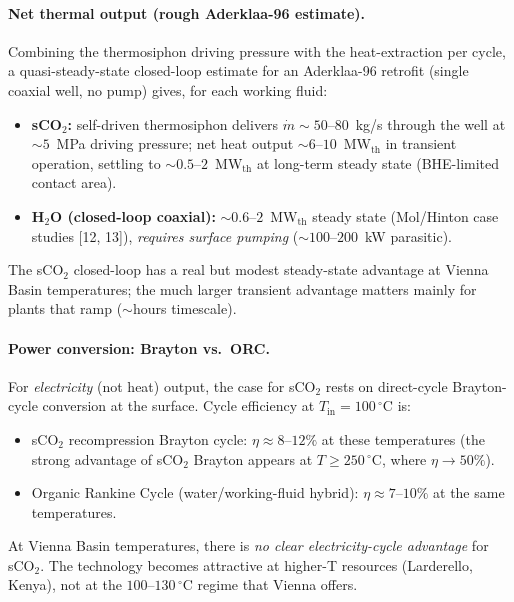 \documentclass{article}
\begin{document}
\paragraph{Net thermal output (rough Aderklaa-96 estimate).}
Combining the thermosiphon driving pressure with the heat-extraction
per cycle, a quasi-steady-state closed-loop estimate for an
Aderklaa-96 retrofit (single coaxial well, no pump) gives, for
each working fluid:
\begin{itemize}
\item \textbf{sCO$_2$:} self-driven thermosiphon delivers
$\dot m \sim 50$--$80$~kg/s through the well at $\sim 5$~MPa
driving pressure; net heat output $\sim 6$--$10$~MW$_{\mathrm{th}}$
in transient operation, settling to $\sim 0.5$--$2$~MW$_{\mathrm{th}}$
at long-term steady state (BHE-limited contact area).
\item \textbf{H$_2$O (closed-loop coaxial):} $\sim 0.6$--$2$~MW$_{\mathrm{th}}$
steady state (Mol/Hinton case studies [12, 13]), \emph{requires
surface pumping} ($\sim 100$--$200$~kW parasitic).
\end{itemize}
The sCO$_2$ closed-loop has a real but modest steady-state
advantage at Vienna Basin temperatures; the much larger
transient advantage matters mainly for plants that ramp
($\sim$hours timescale).

\paragraph{Power conversion: Brayton vs.\ ORC.} For
\emph{electricity} (not heat) output, the case for sCO$_2$ rests
on direct-cycle Brayton-cycle conversion at the surface. Cycle
efficiency at $T_{\mathrm{in}} = 100\,^\circ$C is:
\begin{itemize}
\item sCO$_2$ recompression Brayton cycle: $\eta \approx
8$--$12\%$ at these temperatures (the strong advantage of sCO$_2$
Brayton appears at $T \geq 250\,^\circ$C, where $\eta \to 50\%$).
\item Organic Rankine Cycle (water/working-fluid hybrid): $\eta
\approx 7$--$10\%$ at the same temperatures.
\end{itemize}
At Vienna Basin temperatures, there is \emph{no clear
electricity-cycle advantage} for sCO$_2$. The technology becomes
attractive at higher-T resources (Larderello, Kenya), not at the
$100$--$130\,^\circ$C regime that Vienna offers.
\end{document}
